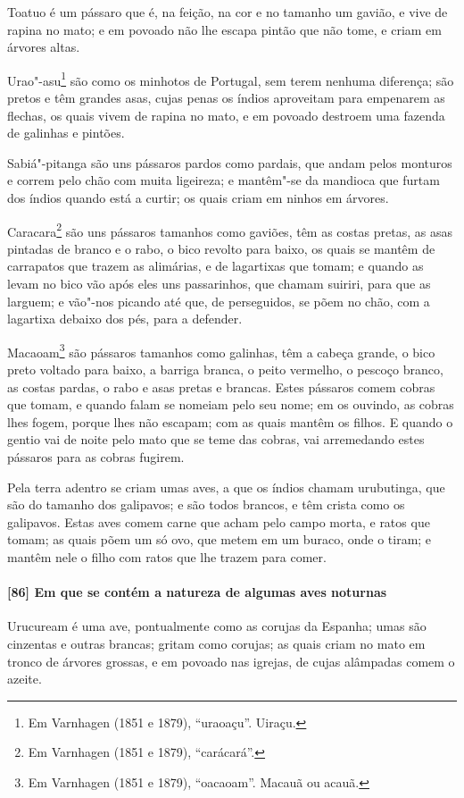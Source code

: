 \begin{linenumbers}
Toatuo é um pássaro que é, na feição, na cor e no tamanho um gavião, e vive de rapina no
mato; e em povoado não lhe escapa pintão que não tome, e criam em árvores altas.

Urao"-asu\footnote{ Em Varnhagen (1851 e 1879), ``uraoaçu''. Uiraçu.} são como os minhotos
de Portugal, sem terem nenhuma diferença; são pretos e têm grandes asas, cujas penas os
índios aproveitam para empenarem as flechas, os quais vivem de rapina no mato, e em
povoado destroem uma fazenda de galinhas e pintões.

Sabiá"-pitanga são uns pássaros pardos como pardais, que andam pelos monturos e correm pelo
chão com muita ligeireza; e mantêm"-se da mandioca que furtam dos índios quando está a
curtir; os quais criam em ninhos em árvores.

Caracara\footnote{ Em Varnhagen (1851 e 1879), ``carácará''.} são uns pássaros tamanhos
como gaviões, têm as costas pretas, as asas pintadas de branco e o rabo, o bico revolto
para baixo, os quais se mantêm de carrapatos que trazem as alimárias, e de lagartixas que
tomam; e quando as levam no bico vão após eles uns passarinhos, que chamam suiriri, para
que as larguem; e vão"-nos picando até que, de perseguidos, se põem no chão, com a
lagartixa debaixo dos pés, para a defender.

Macaoam\footnote{ Em Varnhagen (1851 e 1879), ``oacaoam''. Macauã ou acauã.} são pássaros
tamanhos como galinhas, têm a cabeça grande, o bico preto voltado para baixo, a barriga
branca, o peito vermelho, o pescoço branco, as costas pardas, o rabo e asas pretas e
brancas. Estes pássaros comem cobras que tomam, e quando falam se nomeiam pelo seu nome;
em os ouvindo, as cobras lhes fogem, porque lhes não escapam; com as quais mantêm os
filhos. E quando o gentio vai de noite pelo mato que se teme das cobras, vai arremedando
estes pássaros para as cobras fugirem.

Pela terra adentro se criam umas aves, a que os índios chamam urubutinga, que são do
tamanho dos galipavos; e são todos brancos, e têm crista como os galipavos. Estas aves
comem carne que acham pelo campo morta, e ratos que tomam; as quais põem um só ovo, que
metem em um buraco, onde o tiram; e mantêm nele o filho com ratos que lhe trazem para
comer.

\paragraph{[86] Em que se contém a natureza de algumas aves noturnas}\quad
Urucuream é uma ave, pontualmente como as corujas da Espanha; umas são cinzentas e outras
brancas; gritam como corujas; as quais criam no mato em tronco de árvores grossas, e em
povoado nas igrejas, de cujas alâmpadas comem o azeite.


\end{linenumbers}
